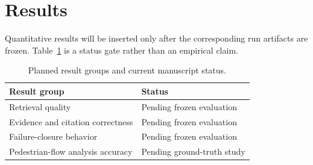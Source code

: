 \section{Results}

Quantitative results will be inserted only after the corresponding run artifacts are frozen. Table~\ref{tab:result-status} is a status gate rather than an empirical claim.

\begin{table}[htbp]
  \centering
  \caption{Planned result groups and current manuscript status.}
  \label{tab:result-status}
  \begin{tabular}{ll}
    \toprule
    Result group & Status \\
    \midrule
    Retrieval quality & Pending frozen evaluation \\
    Evidence and citation correctness & Pending frozen evaluation \\
    Failure-closure behavior & Pending frozen evaluation \\
    Pedestrian-flow analysis accuracy & Pending ground-truth study \\
    \bottomrule
  \end{tabular}
\end{table}
